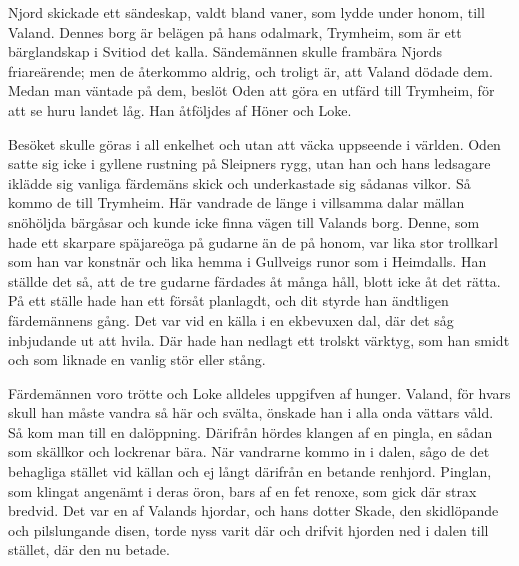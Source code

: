 Njord skickade ett sändeskap, valdt bland vaner, som lydde under honom,
till Valand. Dennes borg är belägen på hans odalmark, Trymheim, som är
ett bärglandskap i Svitiod det kalla. Sändemännen skulle frambära Njords
friareärende; men de återkommo aldrig, och troligt är, att Valand dödade
dem. Medan man väntade på dem, beslöt Oden att göra en utfärd till
Trymheim, för att se huru landet låg. Han åtföljdes af Höner och Loke.

Besöket skulle göras i all enkelhet och utan att väcka uppseende i
världen. Oden satte sig icke i gyllene rustning på Sleipners rygg, utan
han och hans ledsagare iklädde sig vanliga färdemäns skick och
underkastade sig sådanas vilkor. Så kommo de till Trymheim. Här vandrade
de länge i villsamma dalar mällan snöhöljda bärgåsar och kunde icke
finna vägen till Valands borg. Denne, som hade ett skarpare späjareöga
på gudarne än de på honom, var lika stor trollkarl som han var konstnär
och lika hemma i Gullveigs runor som i Heimdalls. Han ställde det så,
att de tre gudarne färdades åt många håll, blott icke åt det rätta. På
ett ställe hade han ett försåt planlagdt, och dit styrde han ändtligen
färdemännens gång. Det var vid en källa i en ekbevuxen dal, där det såg
inbjudande ut att hvila. Där hade han nedlagt ett trolskt värktyg, som
han smidt och som liknade en vanlig stör eller stång.

Färdemännen voro trötte och Loke alldeles uppgifven af hunger. Valand,
för hvars skull han måste vandra så här och svälta, önskade han i alla
onda vättars våld. Så kom man till en dalöppning. Därifrån hördes
klangen af en pingla, en sådan som skällkor och lockrenar bära. När
vandrarne
\protect\hypertarget{lb1625905.xhtmlux5cux23start76}{}{}\protect\hypertarget{lb1625905.xhtmlux5cux23start76-a}{}{}\protect\hypertarget{lb1625905.xhtmlux5cux23start76-b}{}{}\protect\hypertarget{lb1625905.xhtmlux5cux23start76-c}{}{}\protect\hypertarget{lb1625905.xhtmlux5cux23start76-d}{}{}
kommo in i dalen, sågo de det behagliga stället vid källan och ej långt
därifrån en betande renhjord. Pinglan, som klingat angenämt i deras
öron, bars af en fet renoxe, som gick där strax bredvid. Det var en af
Valands hjordar, och hans dotter Skade, den skidlöpande och pilslungande
disen, torde nyss varit där och drifvit hjorden ned i dalen till
stället, där den nu betade.

